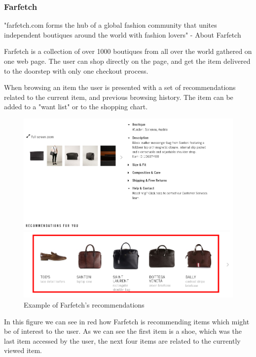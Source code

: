 \subsubsection{Farfetch} %
\label{par:farfetch}

"farfetch.com forms the hub of a global fashion community that unites
independent boutiques around the world with fashion lovers" - About
Farfetch~\cite{Farfetch}

Farfetch is a collection of over 1000 boutiques from all over the world
gathered on one web page.  The user can shop directly on the page, and get the
item delivered to the doorstep with only one checkout process.

When browsing an item the user is presented with a set of recommendations
related to the current item, and previous browsing history.  The item can be
added to a "want list" or to the shopping chart.

\begin{figure}[H]
    \centering
    \includegraphics[scale=0.4]{image/farfetchedRecommendationExample.png}
    \caption{Example of Farfetch's recommendations}
    \label{figure:farfetchedRecommendationExample}
\end{figure}

In this figure we can see in red how Farfetch is recommending items which might
be of interest to the user. As we can see the first item is a shoe, which was
the last item accessed by the user, the next four items are related to the
currently viewed item.

